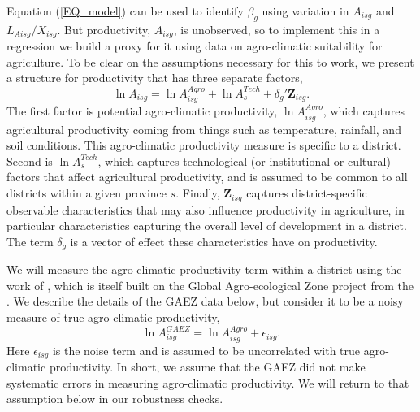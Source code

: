\documentclass[11pt]{article}
\begin{document}
Equation (\ref{EQ_model}) can be used to identify $\beta_g$ using variation in $A_{isg}$ and $L_{Aisg}/X_{isg}$. But productivity, $A_{isg}$, is unobserved, so to implement this in a regression we build a proxy for it using data on agro-climatic suitability for agriculture. To be clear on the assumptions necessary for this to work, we present a structure for productivity that has three separate factors,
\begin{equation}
	\ln A_{isg} = \ln A_{isg}^{Agro} + \ln A_{s}^{Tech} + \delta_g' \mathbf{Z}_{isg}. \label{EQ_prod}
\end{equation}
The first factor is potential agro-climatic productivity, $\ln A_{isg}^{Agro}$, which captures agricultural productivity coming from things such as temperature, rainfall, and soil conditions. This agro-climatic productivity measure is specific to a district. Second is $\ln A_{s}^{Tech}$, which captures technological (or institutional or cultural) factors that affect agricultural productivity, and is assumed to be common to all districts within a given province $s$. Finally, $\mathbf{Z}_{isg}$ captures district-specific observable characteristics that may also influence productivity in agriculture, in particular characteristics capturing the overall level of development in a district. The term $\delta_g$ is a vector of effect these characteristics have on productivity.

We will measure the agro-climatic productivity term within a district using the work of \cite{galorozak2016}, which is itself built on the Global Agro-ecological Zone project from the \cite{gaez}. We describe the details of the GAEZ data below, but consider it to be a noisy measure of true agro-climatic productivity,
\begin{equation}
	\ln A_{isg}^{GAEZ} = \ln A_{isg}^{Agro} + \epsilon_{isg}. \label{EQ_gaez}
\end{equation}
Here $\epsilon_{isg}$ is the noise term and is assumed to be uncorrelated with true agro-climatic productivity. In short, we assume that the GAEZ did not make systematic errors in measuring agro-climatic productivity. We will return to that assumption below in our robustness checks.
\end{document}
